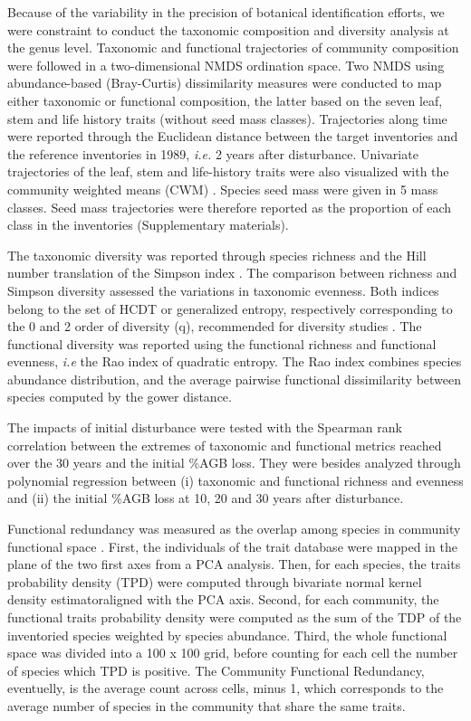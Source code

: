 \documentclass[
  11pt,
  french,
  A4paper,
  extrafontsizes,onecolumn,openright
  ]{memoir}
\begin{document}
Because of the variability in the precision of botanical identification
efforts, we were constraint to conduct the taxonomic composition and
diversity analysis at the genus level. Taxonomic and functional
trajectories of community composition were followed in a two-dimensional
NMDS ordination space. Two NMDS using abundance-based (Bray-Curtis)
dissimilarity measures were conducted to map either taxonomic or
functional composition, the latter based on the seven leaf, stem and
life history traits (without seed mass classes). Trajectories along time
were reported through the Euclidean distance between the target
inventories and the reference inventories in 1989, \emph{i.e.} 2 years
after disturbance. Univariate trajectories of the leaf, stem and
life-history traits were also visualized with the community weighted
means (CWM) \autocite{Diaz2007}. Species seed mass were given in 5 mass
classes. Seed mass trajectories were therefore reported as the
proportion of each class in the inventories (Supplementary materials).

The taxonomic diversity was reported through species richness and the
Hill number translation of the Simpson index \autocite{Hill1973}. The
comparison between richness and Simpson diversity assessed the
variations in taxonomic evenness. Both indices belong to the set of HCDT
or generalized entropy, respectively corresponding to the 0 and 2 order
of diversity (q), recommended for diversity studies
\autocite{Marcon2015b}. The functional diversity was reported using the
functional richness and functional evenness, \emph{i.e} the Rao index of
quadratic entropy. The Rao index combines species abundance
distribution, and the average pairwise functional dissimilarity between
species computed by the gower distance.

The impacts of initial disturbance were tested with the Spearman rank
correlation between the extremes of taxonomic and functional metrics
reached over the 30 years and the initial \%AGB loss. They were besides
analyzed through polynomial regression between (i) taxonomic and
functional richness and evenness and (ii) the initial \%AGB loss at 10,
20 and 30 years after disturbance.

Functional redundancy was measured as the overlap among species in
community functional space \autocite{Carmona2016}. First, the
individuals of the trait database were mapped in the plane of the two
first axes from a PCA analysis. Then, for each species, the traits
probability density (TPD) were computed through bivariate normal kernel
density estimatoraligned with the PCA axis. Second, for each community,
the functional traits probability density were computed as the sum of
the TDP of the inventoried species weighted by species abundance. Third,
the whole functional space was divided into a 100 x 100 grid, before
counting for each cell the number of species which TPD is positive. The
Community Functional Redundancy, eventuelly, is the average count across
cells, minus 1, which corresponds to the average number of species in
the community that share the same traits.
\end{document}
